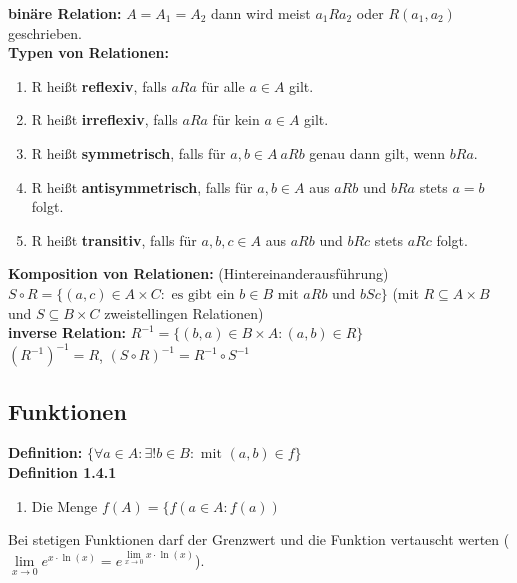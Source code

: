 \textbf{binäre Relation:} $A=A_1=A_2$ dann wird meist $a_1Ra_2$ oder $R(a_1,a_2)$ geschrieben.\\

\textbf{Typen von Relationen:}
\begin{enumerate}
    \item R heißt \textbf{reflexiv}, falls $aRa$ für alle $a\in A$ gilt.
    \item R heißt \textbf{irreflexiv}, falls $aRa$ für kein $a\in A$ gilt.
    \item R heißt \textbf{symmetrisch}, falls für $a,b \in A\ aRb$ genau dann gilt, wenn $bRa$.
    \item R heißt \textbf{antisymmetrisch}, falls für $a,b \in A$ aus $aRb$ und $bRa$ stets $a=b$ folgt.
    \item R heißt \textbf{transitiv}, falls für $a,b,c \in A $ aus $aRb$ und $bRc$ stets $aRc$ folgt.
\end{enumerate}

\textbf{Komposition von Relationen:} (Hintereinanderausführung) $S\circ R = \{(a,c) \in A\times C : \text{ es gibt ein }b\in B \text{ mit } aRb \text{ und } bSc \}$ (mit $R\subseteq A\times B$ und $S \subseteq B\times C$ zweistellingen Relationen)\\

\textbf{inverse Relation:} $R^{-1}= \{(b,a) \in B\times A:(a,b)\in R\}$\\
${(R^{-1})}^{-1} = R$, $(S \circ R)^{-1} = R^{-1} \circ S^{-1}$\\



\subsection{Funktionen}

\textbf{Definition:} $\{\forall a \in A: \exists ! b\in B : \text{ mit } (a,b)\in f\}$\\

\textbf{Definition 1.4.1}
\begin{enumerate}
    \item Die Menge $f(A) = \{f(a \in A : f(a))$
\end{enumerate}

Bei stetigen Funktionen darf der Grenzwert und die Funktion vertauscht werten ($\lim\limits_{x\to 0 }e^{x\cdot \ln (x)}=e^{\lim\limits_{x\to 0 }x\cdot \ln(x)}$).